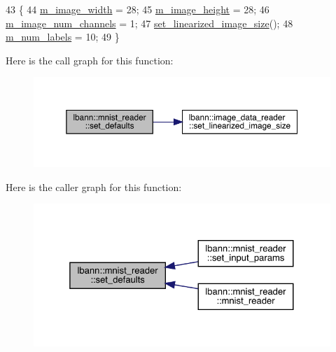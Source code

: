 \begin{DoxyCode}
43                                 \{
44   \hyperlink{classlbann_1_1image__data__reader_af001f3d1c0f1c580b66988233b3a64f0}{m\_image\_width} = 28;
45   \hyperlink{classlbann_1_1image__data__reader_a0632efa3deaa9d61e671f741909eb3fe}{m\_image\_height} = 28;
46   \hyperlink{classlbann_1_1image__data__reader_aab1a440f361521dc7bd583cefe1061f8}{m\_image\_num\_channels} = 1;
47   \hyperlink{classlbann_1_1image__data__reader_a0164b0e3abbe92daef73b36fb925403e}{set\_linearized\_image\_size}();
48   \hyperlink{classlbann_1_1image__data__reader_af280e8758a6ec3acee7c62e6351d17e0}{m\_num\_labels} = 10;
49 \}
\end{DoxyCode}
Here is the call graph for this function\+:\nopagebreak
\begin{figure}[H]
\begin{center}
\leavevmode
\includegraphics[width=350pt]{classlbann_1_1mnist__reader_a5b9a3d56e2d1e1c6820b3c7cc8cde17d_cgraph}
\end{center}
\end{figure}
Here is the caller graph for this function\+:\nopagebreak
\begin{figure}[H]
\begin{center}
\leavevmode
\includegraphics[width=325pt]{classlbann_1_1mnist__reader_a5b9a3d56e2d1e1c6820b3c7cc8cde17d_icgraph}
\end{center}
\end{figure}
\mbox{\label{classlbann_1_1mnist__reader_aa50ae6f2aeb5800de0e15e3ab9046338}} 

